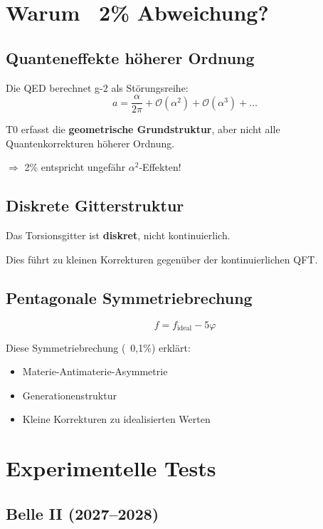 	\section{Warum ~2\% Abweichung?}
	
	\subsection{Quanteneffekte höherer Ordnung}
	
	Die QED berechnet g-2 als Störungsreihe:
	\begin{equation}
		a = \frac{\alpha}{2\pi} + \mathcal{O}(\alpha^2) + \mathcal{O}(\alpha^3) + \ldots
	\end{equation}
	
	T0 erfasst die \textbf{geometrische Grundstruktur}, aber nicht alle Quantenkorrekturen höherer Ordnung.
	
	$\Rightarrow$ 2\% entspricht ungefähr $\alpha^2$-Effekten!
	
	\subsection{Diskrete Gitterstruktur}
	
	Das Torsionsgitter ist \textbf{diskret}, nicht kontinuierlich.
	
	Dies führt zu kleinen Korrekturen gegenüber der kontinuierlichen QFT.
	
	\subsection{Pentagonale Symmetriebrechung}
	
	\begin{equation}
		f = f_{\text{ideal}} - 5\varphi
	\end{equation}
	
	Diese Symmetriebrechung (~0{,}1\%) erklärt:
	\begin{itemize}
		\item Materie-Antimaterie-Asymmetrie
		\item Generationenstruktur
		\item Kleine Korrekturen zu idealisierten Werten
	\end{itemize}
	
	\section{Experimentelle Tests}
	
	\subsection{Belle II (2027--2028)}
	
